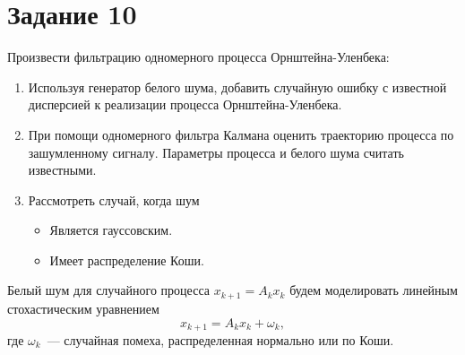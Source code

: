 \section{Задание 10}

Произвести фильтрацию одномерного процесса Орнштейна-Уленбека:
\begin{enumerate}
    \item Используя генератор белого шума, добавить случайную ошибку с 
    известной дисперсией к реализации процесса Орнштейна-Уленбека.
	\item При помощи одномерного фильтра Калмана оценить траекторию процесса по 
    зашумленному сигналу. Параметры процесса и белого шума считать известными.
	\item Рассмотреть случай, когда шум
	\begin{itemize}
		\item Является гауссовским.
		\item Имеет распределение Коши.
	\end{itemize}
\end{enumerate}
\bigskip

Белый шум для случайного процесса $x_{k+1} = A_k x_k$ будем моделировать 
линейным стохастическим уравнением 
\begin{equation} \label{white_noise}
	 x_{k+1} = A_k x_k + \omega_k,
\end{equation}
где $\omega_k$~--- случайная помеха, распределенная нормально или по Коши.

